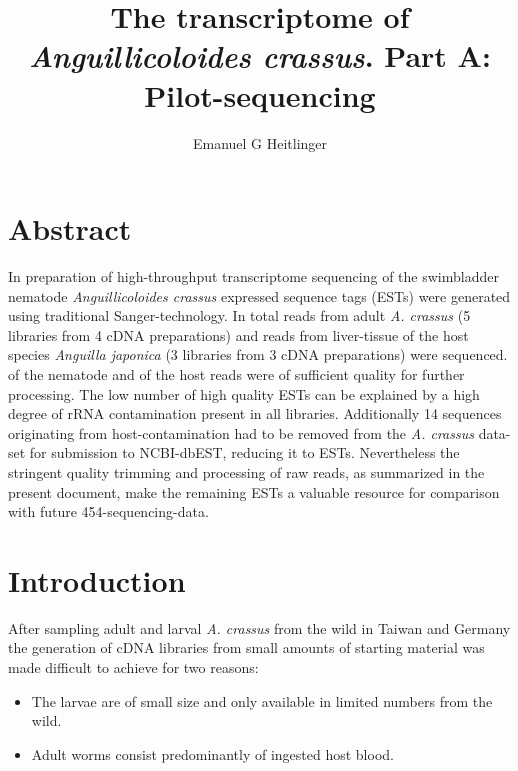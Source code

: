 \documentclass[12pt,a4paper]{article}
\begin{document}








\title{The transcriptome of \textit{Anguillicoloides crassus}. Part A:
  Pilot-sequencing} \author{Emanuel G Heitlinger} \date{}
\maketitle

\section*{Abstract}
In preparation of high-throughput transcriptome sequencing of the
swimbladder nematode \textit{Anguillicoloides crassus} expressed
sequence tags (ESTs) were generated using traditional
Sanger-technology. In total  reads from
adult \textit{A. crassus} (5 libraries from 4 cDNA preparations) and
 reads from liver-tissue of the host
species \textit{Anguilla japonica} (3 libraries from 3 cDNA
preparations) were sequenced.  of the
nematode and  of the host reads were
of sufficient quality for further processing. The low number of high
quality ESTs can be explained by a high degree of rRNA contamination
present in all libraries. Additionally
14 sequences originating from
host-contamination had to be removed from the \textit{A. crassus}
data-set for submission to NCBI-dbEST, reducing it to
 ESTs. Nevertheless the stringent
quality trimming and processing of raw reads, as summarized in the
present document, make the remaining ESTs a valuable resource for
comparison with future 454-sequencing-data.

\section*{Introduction}

After sampling adult and larval \textit{A. crassus} from the wild in
Taiwan and Germany the generation of cDNA libraries from small amounts
of starting material was made difficult to achieve for two reasons:
\begin{itemize}
\item The larvae are of small size and only available in limited
  numbers from the wild.
\item Adult worms consist predominantly of ingested host blood.
\end{itemize}
\end{document}
